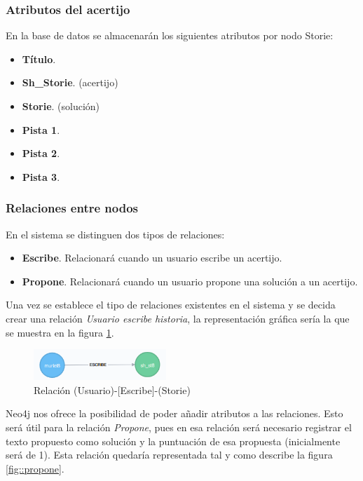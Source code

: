\subsubsection{Atributos del acertijo}
En la base de datos se almacenarán los siguientes atributos por nodo Storie:

\begin{itemize}
    \item \textbf{Título}.
    \item \textbf{Sh\_Storie}. (acertijo)
    \item \textbf{Storie}. (solución)
    \item \textbf{Pista 1}.
    \item \textbf{Pista 2}.
    \item \textbf{Pista 3}.
\end{itemize}

\subsubsection{Relaciones entre nodos}

En el sistema se distinguen dos tipos de relaciones:

\begin{itemize}
    \item \textbf{Escribe}. Relacionará cuando un usuario escribe un acertijo.
    \item \textbf{Propone}. Relacionará cuando un usuario propone una solución a un acertijo.
\end{itemize}

Una vez se establece el tipo de relaciones existentes en el sistema y se decida crear una relación \textit{Usuario escribe historia}, la representación gráfica sería la que se muestra en la figura \ref{fig::escribe}.

\begin{figure}[hbtp]
     \centerline{\includegraphics[width=5cm]{figuras/escribe.png}}
    \caption{Relación (Usuario)-[Escribe]-(Storie)} 
    \label{fig::escribe}
\end{figure}

Neo4j nos ofrece la posibilidad de poder añadir atributos a las relaciones. Esto será útil para la relación \textit{Propone}, pues en esa relación será necesario registrar el texto propuesto como solución y la puntuación de esa propuesta (inicialmente será de 1). Esta relación quedaría representada tal y como describe la figura \ref{fig::propone}.

